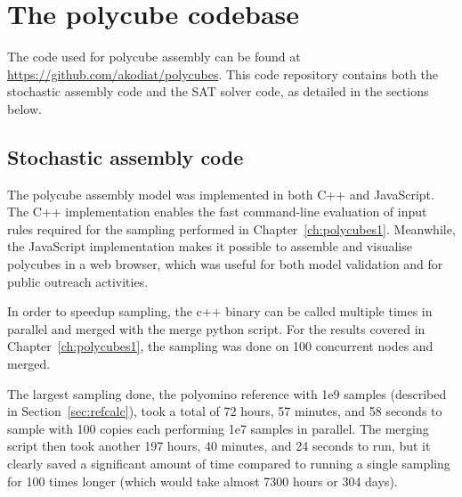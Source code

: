 

\chapter{The polycube codebase}
\label{ch:appendix_polycubes}

\minitoc

The code used for polycube assembly can be found at \url{https://github.com/akodiat/polycubes}. This code repository contains both the stochastic assembly code and the SAT solver code, as detailed in the sections below.

\section{Stochastic assembly code}
The polycube assembly model was implemented in both C++ and JavaScript. The C++ implementation enables the fast command-line evaluation of input rules required for the sampling performed in Chapter~\ref{ch:polycubes1}. Meanwhile, the JavaScript implementation makes it possible to assemble and visualise polycubes in a web browser, which was useful for both model validation and for public outreach activities.

In order to speedup sampling, the c++ binary can be called multiple times in parallel and merged with the merge python script. For the results covered in Chapter~\ref{ch:polycubes1}, the sampling was done on 100 concurrent nodes and merged.

The largest sampling done, the polyomino reference with 1e9 samples (described in Section~\ref{sec:refcalc}), took a total of 72 hours, 57 minutes, and 58 seconds to sample with 100 copies each performing 1e7 samples in parallel. The merging script then took another 197 hours, 40 minutes, and 24 seconds to run, but it clearly saved a significant amount of time compared to running a single sampling for 100 times longer (which would take almost 7300 hours or 304 days).

